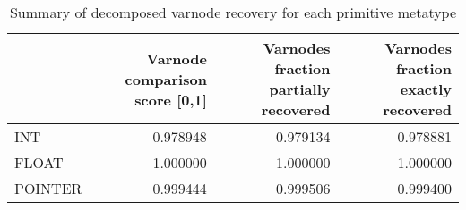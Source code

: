 \begin{table}
\centering
\caption{Summary of decomposed varnode recovery for each primitive metatype}
\label{table:metatype-recovery-summary-decomposed}
\begin{tabular}{lrrr}
\toprule
{} &  Varnode comparison score [0,1] &  Varnodes fraction partially recovered &  Varnodes fraction exactly recovered \\
\midrule
INT     &                        0.978948 &                               0.979134 &                             0.978881 \\
FLOAT   &                        1.000000 &                               1.000000 &                             1.000000 \\
POINTER &                        0.999444 &                               0.999506 &                             0.999400 \\
\bottomrule
\end{tabular}
\end{table}
